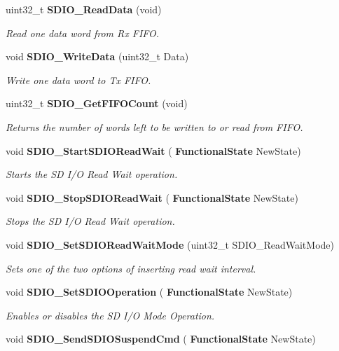 \begin{DoxyCompactItemize}
uint32\+\_\+t \textbf{ S\+D\+I\+O\+\_\+\+Read\+Data} (void)
\begin{DoxyCompactList}\small\item\em Read one data word from Rx F\+I\+FO. \end{DoxyCompactList}\item 
void \textbf{ S\+D\+I\+O\+\_\+\+Write\+Data} (uint32\+\_\+t Data)
\begin{DoxyCompactList}\small\item\em Write one data word to Tx F\+I\+FO. \end{DoxyCompactList}\item 
uint32\+\_\+t \textbf{ S\+D\+I\+O\+\_\+\+Get\+F\+I\+F\+O\+Count} (void)
\begin{DoxyCompactList}\small\item\em Returns the number of words left to be written to or read from F\+I\+FO. \end{DoxyCompactList}\item 
void \textbf{ S\+D\+I\+O\+\_\+\+Start\+S\+D\+I\+O\+Read\+Wait} (\textbf{ Functional\+State} New\+State)
\begin{DoxyCompactList}\small\item\em Starts the SD I/O Read Wait operation. \end{DoxyCompactList}\item 
void \textbf{ S\+D\+I\+O\+\_\+\+Stop\+S\+D\+I\+O\+Read\+Wait} (\textbf{ Functional\+State} New\+State)
\begin{DoxyCompactList}\small\item\em Stops the SD I/O Read Wait operation. \end{DoxyCompactList}\item 
void \textbf{ S\+D\+I\+O\+\_\+\+Set\+S\+D\+I\+O\+Read\+Wait\+Mode} (uint32\+\_\+t S\+D\+I\+O\+\_\+\+Read\+Wait\+Mode)
\begin{DoxyCompactList}\small\item\em Sets one of the two options of inserting read wait interval. \end{DoxyCompactList}\item 
void \textbf{ S\+D\+I\+O\+\_\+\+Set\+S\+D\+I\+O\+Operation} (\textbf{ Functional\+State} New\+State)
\begin{DoxyCompactList}\small\item\em Enables or disables the SD I/O Mode Operation. \end{DoxyCompactList}\item 
void \textbf{ S\+D\+I\+O\+\_\+\+Send\+S\+D\+I\+O\+Suspend\+Cmd} (\textbf{ Functional\+State} New\+State)

\end{DoxyCompactItemize}
